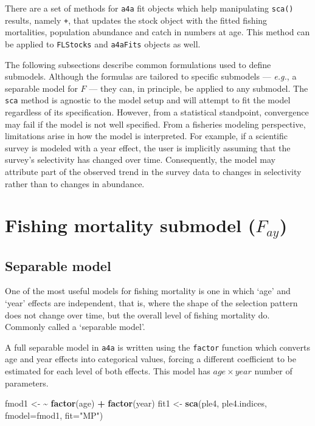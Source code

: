 \documentclass[
]{book}
\newenvironment{Shaded}{\begin{snugshade}}{\end{snugshade}}
\newcommand{\AttributeTok}[1]{\textcolor[rgb]{0.13,0.29,0.53}{#1}}
\newcommand{\ErrorTok}[1]{\textcolor[rgb]{0.64,0.00,0.00}{\textbf{#1}}}
\newcommand{\FunctionTok}[1]{\textcolor[rgb]{0.13,0.29,0.53}{\textbf{#1}}}
\newcommand{\NormalTok}[1]{#1}
\newcommand{\OtherTok}[1]{\textcolor[rgb]{0.56,0.35,0.01}{#1}}
\newcommand{\SpecialCharTok}[1]{\textcolor[rgb]{0.81,0.36,0.00}{\textbf{#1}}}
\newcommand{\StringTok}[1]{\textcolor[rgb]{0.31,0.60,0.02}{#1}}
\begin{document}
There are a set of methods for \texttt{a4a} fit objects which help manipulating \texttt{sca()} results, namely \texttt{+}, that updates the stock object with the fitted fishing mortalities, population abundance and catch in numbers at age. This method can be applied to \texttt{FLStocks} and \texttt{a4aFits} objects as well.

The following subsections describe common formulations used to define submodels. Although the formulas are tailored to specific submodels --- \emph{e.g.}, a separable model for \(F\) --- they can, in principle, be applied to any submodel. The \texttt{sca} method is agnostic to the model setup and will attempt to fit the model regardless of its specification. However, from a statistical standpoint, convergence may fail if the model is not well specified. From a fisheries modeling perspective, limitations arise in how the model is interpreted. For example, if a scientific survey is modeled with a year effect, the user is implicitly assuming that the survey's selectivity has changed over time. Consequently, the model may attribute part of the observed trend in the survey data to changes in selectivity rather than to changes in abundance.

\hypertarget{fishing-mortality-submodel-f_ay}{%
\section{\texorpdfstring{Fishing mortality submodel (\(F_{ay}\))}{Fishing mortality submodel (F\_\{ay\})}}\label{fishing-mortality-submodel-f_ay}}

\hypertarget{separable-model}{%
\subsection{Separable model}\label{separable-model}}

One of the most useful models for fishing mortality is one in which `age' and `year' effects are independent, that is, where the shape of the selection pattern does not change over time, but the overall level of fishing mortality do. Commonly called a `separable model'.

A full separable model in \texttt{a4a} is written using the \texttt{factor} function which converts age and year effects into categorical values, forcing a different coefficient to be estimated for each level of both effects. This model has \(age \times year\) number of parameters.

\begin{Shaded}
\begin{Highlighting}[]
\NormalTok{fmod1 }\OtherTok{\textless{}{-}} \ErrorTok{\textasciitilde{}} \FunctionTok{factor}\NormalTok{(age) }\SpecialCharTok{+} \FunctionTok{factor}\NormalTok{(year)}
\NormalTok{fit1 }\OtherTok{\textless{}{-}} \FunctionTok{sca}\NormalTok{(ple4, ple4.indices, }\AttributeTok{fmodel=}\NormalTok{fmod1, }\AttributeTok{fit=}\StringTok{"MP"}\NormalTok{)}
\end{Highlighting}
\end{Shaded}
\end{document}
